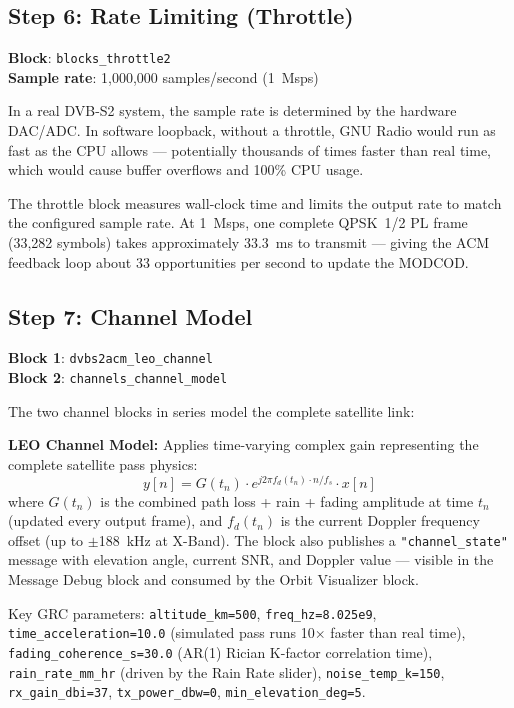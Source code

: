 \documentclass[12pt,a4paper]{report}
\begin{document}
\subsection{Step 6: Rate Limiting (Throttle)}

\textbf{Block}: \texttt{blocks\_throttle2} \\
\textbf{Sample rate}: 1,000,000 samples/second (1~Msps)

In a real DVB-S2 system, the sample rate is determined by the hardware DAC/ADC.
In software loopback, without a throttle, GNU Radio would run as fast as the
CPU allows --- potentially thousands of times faster than real time, which
would cause buffer overflows and 100\% CPU usage.

The throttle block measures wall-clock time and limits the output rate to match
the configured sample rate. At 1~Msps, one complete QPSK~1/2 PL frame
(33,282 symbols) takes approximately 33.3~ms to transmit --- giving the ACM
feedback loop about 33 opportunities per second to update the MODCOD.

\subsection{Step 7: Channel Model}

\textbf{Block 1}: \texttt{dvbs2acm\_leo\_channel} \\
\textbf{Block 2}: \texttt{channels\_channel\_model}

The two channel blocks in series model the complete satellite link:

\textbf{LEO Channel Model:} Applies time-varying complex gain representing the
complete satellite pass physics:
\begin{equation}
    y[n] = G(t_n) \cdot e^{j2\pi f_d(t_n) \cdot n / f_s} \cdot x[n]
\end{equation}
where $G(t_n)$ is the combined path loss + rain + fading amplitude at time
$t_n$ (updated every output frame), and $f_d(t_n)$ is the current Doppler
frequency offset (up to $\pm$188~kHz at X-Band). The block also publishes a
\texttt{"channel\_state"} message with elevation angle, current SNR, and
Doppler value --- visible in the Message Debug block and consumed by the
Orbit Visualizer block.

Key GRC parameters: \texttt{altitude\_km=500}, \texttt{freq\_hz=8.025e9},
\texttt{time\_acceleration=10.0} (simulated pass runs 10$\times$ faster than
real time), \texttt{fading\_coherence\_s=30.0} (AR(1) Rician K-factor
correlation time), \texttt{rain\_rate\_mm\_hr} (driven by the Rain Rate
slider), \texttt{noise\_temp\_k=150}, \texttt{rx\_gain\_dbi=37},
\texttt{tx\_power\_dbw=0}, \texttt{min\_elevation\_deg=5}.
\end{document}
